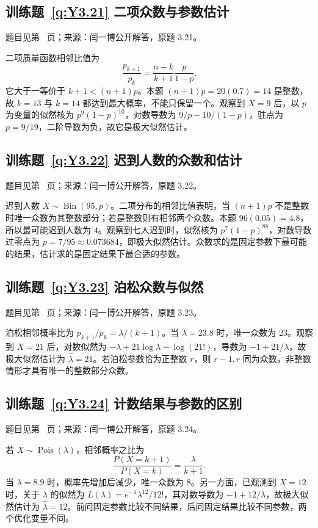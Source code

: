 \subsection*{训练题~\ref{q:Y3.21} 二项众数与参数估计}\label{a:Y3.21}{\small 题目见第~\pageref{q:Y3.21} 页；来源：闫一博公开解答，原题 3.21。}
\begin{solve}二项质量函数相邻比值为\[\frac{p_{k+1}}{p_k}=\frac{n-k}{k+1}\frac{p}{1-p}.\]它大于一等价于 $k+1<(n+1)p$。本题 $(n+1)p=20(0.7)=14$ 是整数，故 $k=13$ 与 $k=14$ 都达到最大概率，不能只保留一个。观察到 $X=9$ 后，以 $p$ 为变量的似然核为 $p^9(1-p)^{10}$，对数导数为 $9/p-10/(1-p)$，驻点为 $p=9/19$，二阶导数为负，故它是极大似然估计。\end{solve}

\subsection*{训练题~\ref{q:Y3.22} 迟到人数的众数和估计}\label{a:Y3.22}{\small 题目见第~\pageref{q:Y3.22} 页；来源：闫一博公开解答，原题 3.22。}
\begin{solve}迟到人数 $X\sim\operatorname{Bin}(95,p)$。二项分布的相邻比值表明，当 $(n+1)p$ 不是整数时唯一众数为其整数部分；若是整数则有相邻两个众数。本题 $96(0.05)=4.8$，所以最可能迟到人数为 $4$。观察到七人迟到时，似然核为 $p^7(1-p)^{88}$，对数导数过零点为 $p=7/95\approx0.073684$，即极大似然估计。众数求的是固定参数下最可能的结果，估计求的是固定结果下最合适的参数。\end{solve}

\subsection*{训练题~\ref{q:Y3.23} 泊松众数与似然}\label{a:Y3.23}{\small 题目见第~\pageref{q:Y3.23} 页；来源：闫一博公开解答，原题 3.23。}
\begin{solve}泊松相邻概率比为 $p_{k+1}/p_k=\lambda/(k+1)$。当 $\lambda=23.8$ 时，唯一众数为 $23$。观察到 $X=21$ 后，对数似然为 $-\lambda+21\log\lambda-\log(21!)$，导数为 $-1+21/\lambda$，故极大似然估计为 $\widehat\lambda=21$。若泊松参数恰为正整数 $r$，则 $r-1,r$ 同为众数，非整数情形才具有唯一的整数部分众数。\end{solve}

\subsection*{训练题~\ref{q:Y3.24} 计数结果与参数的区别}\label{a:Y3.24}{\small 题目见第~\pageref{q:Y3.24} 页；来源：闫一博公开解答，原题 3.24。}
\begin{solve}若 $X\sim\operatorname{Pois}(\lambda)$，相邻概率之比为\[\frac{P(X=k+1)}{P(X=k)}=\frac{\lambda}{k+1}.\]当 $\lambda=8.9$ 时，概率先增加后减少，唯一众数为 $8$。另一方面，已观测到 $X=12$ 时，关于 $\lambda$ 的似然为 $L(\lambda)=e^{-\lambda}\lambda^{12}/12!$，其对数导数为 $-1+12/\lambda$，故极大似然估计为 $\widehat\lambda=12$。前问固定参数比较不同结果，后问固定结果比较不同参数，两个优化变量不同。\end{solve}

